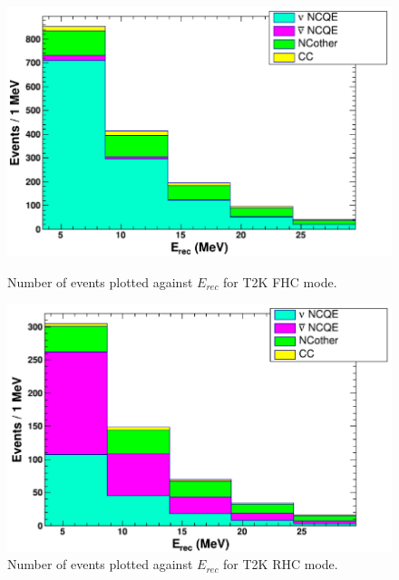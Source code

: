 \begin{figure}
    \centering
    
    \begin{minipage}{0.49\textwidth}
        \centering
        \includegraphics[width=\textwidth]{Figures/erec_2728_POT_FHC.PNG} %
        \caption{Number of events plotted against $E_{rec}$ for T2K FHC mode.}
    \end{minipage}\hfill
    \begin{minipage}{0.49\textwidth}
        \centering
        \includegraphics[width=\textwidth]{Figures/erec_2728_POT_RHC.PNG} %
        \caption{Number of events plotted against $E_{rec}$ for T2K RHC mode.}
        \label{fig:erec_fhc_rhc_2728}
    \end{minipage}
\end{figure}



